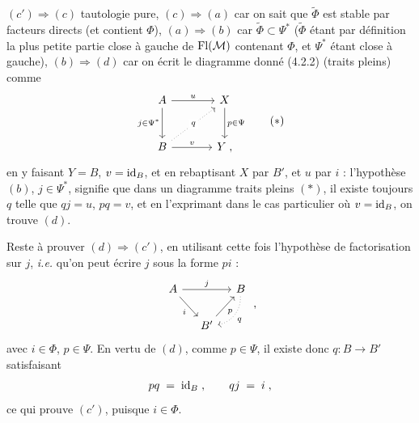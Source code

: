 $(c')\Longrightarrow(c)$ tautologie pure, $(c)\Longrightarrow(a)$ car on sait que $\widetilde{\Phi}$ est stable par facteurs directs (et contient $\Phi$), $(a)\Longrightarrow(b)$ car $\widetilde{\Phi}\subset\Psi^*$ ($\widetilde{\Phi}$ étant par définition la plus petite partie close à gauche de $\mathrm{Fl}(\mathcal{M})$ contenant $\Phi$, et $\Psi^*$ étant close à gauche), $(b)\Longrightarrow(d)$ car on écrit le diagramme donné (4.2.2) (traits pleins) comme %
\[
\begin{tikzcd}[row sep=large, column sep=large]
A \arrow[r, "u"] \arrow[d, "j\in\Psi^*"'] & X \arrow[d, "p\in\Psi"] \\
B \arrow[ur, dotted, "q" description] \arrow[r, "v"] & Y \;,
\end{tikzcd}
\tag*{$(*)$}
\]
en y faisant $Y=B$, $v=\mathrm{id}_B$, et en rebaptisant $X$ par $B'$, et $u$ par $i$ : l'hypothèse $(b)$, $j\in\Psi^*$, signifie que dans un diagramme traits pleins $(*)$, il existe toujours $q$ telle que $qj=u$, $pq=v$, et en l'exprimant dans le cas particulier où $v=\mathrm{id}_B$, on trouve $(d)$.

Reste à prouver $(d)\Longrightarrow(c')$, en utilisant cette fois l'hypothèse de factorisation sur $j$, \textit{i.e.} qu'on peut écrire $j$ sous la forme $pi$ :
\[
\begin{tikzcd}[column sep=small]
A \arrow[rr, "j"] \arrow[dr, "i"'] & & B \arrow[dl, dotted, bend left=40, "q"] \\
& B' \arrow[ur, "p"'] &
\end{tikzcd}
\;,
\]
avec $i\in\Phi$, $p\in\Psi$. En vertu de $(d)$, comme $p\in\Psi$, il existe donc $q:B\longrightarrow B'$ satisfaisant
\[
pq \;=\; \mathrm{id}_B\;, \qquad qj \;=\; i\;,
\]
ce qui prouve $(c')$, puisque $i\in\Phi$.

